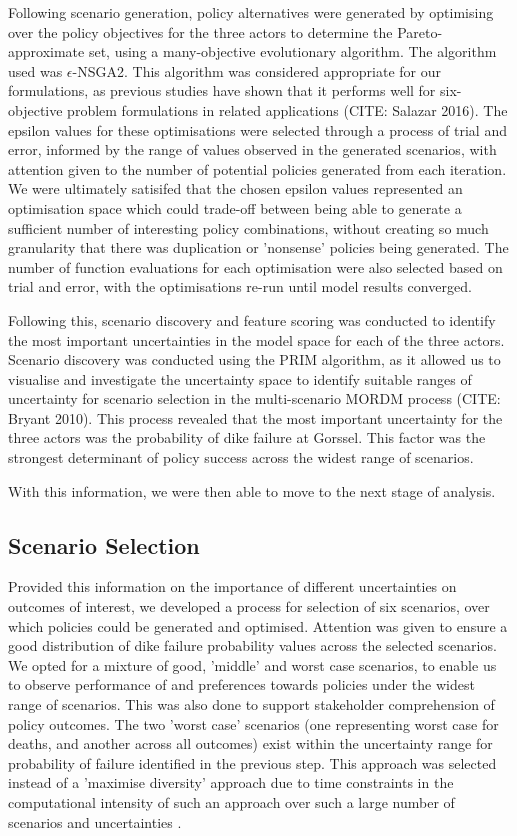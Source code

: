 Following scenario generation, policy alternatives were generated by optimising over the policy objectives for the three actors to determine the Pareto-approximate set, using a many-objective evolutionary algorithm. The algorithm used was $\epsilon$-NSGA2. This algorithm was considered appropriate for our formulations, as previous studies have shown that it performs well for six-objective problem formulations in related applications (CITE: Salazar 2016). The epsilon values for these optimisations were selected through a process of trial and error, informed by the range of values observed in the generated scenarios, with attention given to the number of potential policies generated from each iteration. We were ultimately satisifed that the chosen epsilon values represented an optimisation space which could trade-off between being able to generate a sufficient number of interesting policy combinations, without creating so much granularity that there was duplication or 'nonsense' policies being generated. The number of function evaluations for each optimisation were also selected based on trial and error, with the optimisations re-run until model results converged.

Following this, scenario discovery and feature scoring was conducted to identify the most important uncertainties in the model space for each of the three actors. Scenario discovery was conducted using the PRIM algorithm, as it allowed us to visualise and investigate the uncertainty space to identify suitable ranges of uncertainty for scenario selection in the multi-scenario MORDM process (CITE: Bryant 2010). This process revealed that the most important uncertainty for the three actors was the probability of dike failure at Gorssel. This factor was the strongest determinant of policy success across the widest range of scenarios.

With this information, we were then able to move to the next stage of analysis.

\subsection{Scenario Selection}
Provided this information on the importance of different uncertainties on outcomes of interest, we developed a process for selection of six scenarios, over which policies could be generated and optimised. Attention was given to ensure a good distribution of dike failure probability values across the selected scenarios. We opted for a mixture of good, 'middle' and worst case scenarios, to enable us to observe performance of and preferences towards policies under the widest range of scenarios. This was also done to support stakeholder comprehension of policy outcomes. The two 'worst case' scenarios (one representing worst case for deaths, and another across all outcomes) exist within the uncertainty range for probability of failure identified in the previous step. This approach was selected instead of a 'maximise diversity' approach due to time constraints in the computational intensity of such an approach over such a large number of scenarios and uncertainties \parencite{eker_including_2018}.

